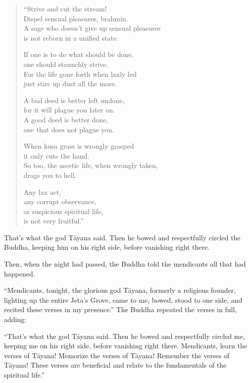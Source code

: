 \documentclass[12pt,openany]{book}%
\begin{document}
\begin{verse}%
“Strive and cut the stream! \\
Dispel sensual pleasures, brahmin. \\
A sage who doesn’t give up sensual pleasures \\
is not reborn in a unified state. 

If one is to do what should be done, \\
one should staunchly strive. \\
For the life gone forth when laxly led \\
just stirs up dust all the more. 

A bad deed is better left undone, \\
for it will plague you later on. \\
A good deed is better done, \\
one that does not plague you. 

When kusa grass is wrongly grasped \\
it only cuts the hand. \\
So too, the ascetic life, when wrongly taken, \\
drags you to hell. 

Any lax act, \\
any corrupt observance, \\
or suspicious spiritual life, \\
is not very fruitful.” 

%
\end{verse}

That’s what the god \textsanskrit{Tāyana} said. Then he bowed and respectfully circled the Buddha, keeping him on his right side, before vanishing right there. 

Then, when the night had passed, the Buddha told the mendicants all that had happened. 

“Mendicants, tonight, the glorious god \textsanskrit{Tāyana}, formerly a religious founder, lighting up the entire Jeta’s Grove, came to me, bowed, stood to one side, and recited these verses in my presence.” The Buddha repeated the verses in full, adding: 

“That’s what the god \textsanskrit{Tāyana} said. Then he bowed and respectfully circled me, keeping me on his right side, before vanishing right there. Mendicants, learn the verses of \textsanskrit{Tāyana}! Memorize the verses of \textsanskrit{Tāyana}! Remember the verses of \textsanskrit{Tāyana}! These verses are beneficial and relate to the fundamentals of the spiritual life.” 
\end{document}
